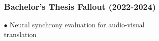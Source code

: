 \documentclass[aspectratio=169]{beamer}
\begin{document}
\begin{frame}[fragile]
	\frametitle{Bachelor's Thesis Fallout (2022-2024)}
    \begin{minipage}{1.0\textwidth}
        \begin{minipage}{.55\textwidth}
            {\color{thiscolor}$\bullet$} Neural synchrony evaluation for audio-visual\\
            translation \citep{nayak2022DeepDiveNeural}
        \end{minipage}
        \begin{minipage}{.45\textwidth}
            \begin{figure}
            \centering
            \captionsetup[subfigure]{labelformat=empty}
            \end{figure}
        \end{minipage}
    \end{minipage}
    

\end{frame}
\end{document}
